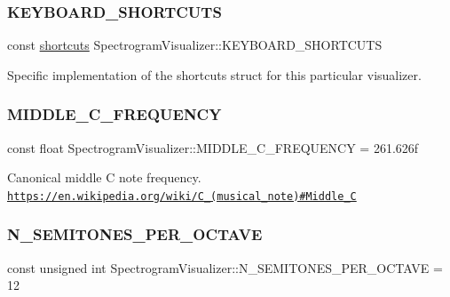 \subsubsection{\texorpdfstring{K\+E\+Y\+B\+O\+A\+R\+D\+\_\+\+S\+H\+O\+R\+T\+C\+U\+TS}{KEYBOARD\_SHORTCUTS}}
{\ttfamily const \hyperlink{structSpectrogramVisualizer_1_1shortcuts}{shortcuts} Spectrogram\+Visualizer\+::\+K\+E\+Y\+B\+O\+A\+R\+D\+\_\+\+S\+H\+O\+R\+T\+C\+U\+TS\hspace{0.3cm}{\ttfamily [static]}}

Specific implementation of the shortcuts struct for this particular visualizer. \hypertarget{structSpectrogramVisualizer_adfe2ed143313d59d7c118cadec1460b9}{}\label{structSpectrogramVisualizer_adfe2ed143313d59d7c118cadec1460b9} 
\subsubsection{\texorpdfstring{M\+I\+D\+D\+L\+E\+\_\+\+C\+\_\+\+F\+R\+E\+Q\+U\+E\+N\+CY}{MIDDLE\_C\_FREQUENCY}}
{\ttfamily const float Spectrogram\+Visualizer\+::\+M\+I\+D\+D\+L\+E\+\_\+\+C\+\_\+\+F\+R\+E\+Q\+U\+E\+N\+CY = 261.\+626f\hspace{0.3cm}{\ttfamily [static]}}

Canonical middle C note frequency. \href{https://en.wikipedia.org/wiki/C_(musical_note)#Middle_C}{\tt https\+://en.\+wikipedia.\+org/wiki/\+C\+\_\+(musical\+\_\+note)\#\+Middle\+\_\+C} \hypertarget{structSpectrogramVisualizer_affbdeff0d7b800feb17aab0a367222da}{}\label{structSpectrogramVisualizer_affbdeff0d7b800feb17aab0a367222da} 
\subsubsection{\texorpdfstring{N\+\_\+\+S\+E\+M\+I\+T\+O\+N\+E\+S\+\_\+\+P\+E\+R\+\_\+\+O\+C\+T\+A\+VE}{N\_SEMITONES\_PER\_OCTAVE}}
{\ttfamily const unsigned int Spectrogram\+Visualizer\+::\+N\+\_\+\+S\+E\+M\+I\+T\+O\+N\+E\+S\+\_\+\+P\+E\+R\+\_\+\+O\+C\+T\+A\+VE = 12\hspace{0.3cm}{\ttfamily [static]}}

